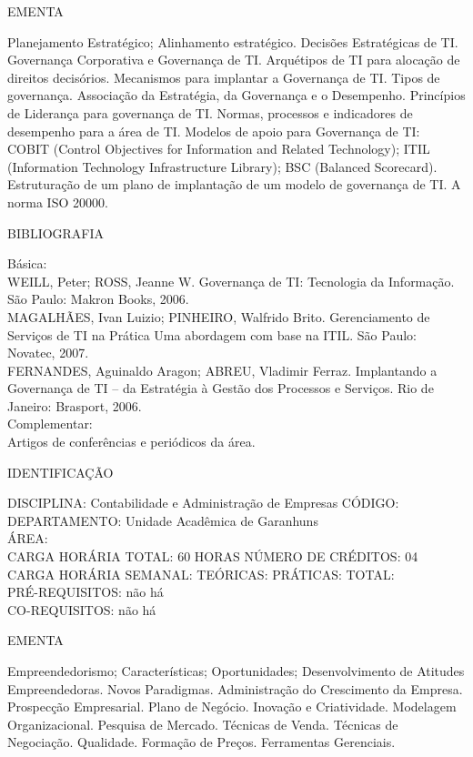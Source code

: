\documentclass[
	12pt,				%
	openright,			%
  oneside,     %
	a4paper,			%
	english,			%
	french,				%
	spanish,			%
	brazil				%
	]{abntex2}
\begin{document}
\begin{apendicesenv}
EMENTA 

Planejamento Estratégico; Alinhamento estratégico. Decisões Estratégicas
de TI. Governança Corporativa e Governança de TI. Arquétipos de TI para
alocação de direitos decisórios. Mecanismos para implantar a Governança
de TI. Tipos de governança. Associação da Estratégia, da Governança e o
Desempenho. Princípios de Liderança para governança de TI. Normas,
processos e indicadores de desempenho para a área de TI. Modelos de
apoio para Governança de TI: COBIT (Control Objectives for Information
and Related Technology); ITIL (Information Technology Infrastructure
Library); BSC (Balanced Scorecard). Estruturação de um plano de
implantação de um modelo de governança de TI. A norma ISO 20000.

BIBLIOGRAFIA 

Básica:\\
WEILL, Peter; ROSS, Jeanne W. Governança de TI: Tecnologia da
Informação. São Paulo: Makron Books, 2006.\\
MAGALHÃES, Ivan Luizio; PINHEIRO, Walfrido Brito. Gerenciamento de
Serviços de TI na Prática  Uma abordagem com base na ITIL. São
Paulo: Novatec, 2007.\\
FERNANDES, Aguinaldo Aragon; ABREU, Vladimir Ferraz. Implantando a
Governança de TI -- da Estratégia à Gestão dos Processos e Serviços.
Rio de Janeiro: Brasport, 2006.\\
Complementar:\\
Artigos de conferências e periódicos da área.

\newpage IDENTIFICAÇÃO

DISCIPLINA: Contabilidade e Administração de Empresas CÓDIGO:\\ 
DEPARTAMENTO: Unidade Acadêmica de Garanhuns\\
ÁREA: \\
CARGA HORÁRIA TOTAL: 60 HORAS NÚMERO DE CRÉDITOS: 04\\
CARGA HORÁRIA SEMANAL: TEÓRICAS: PRÁTICAS: TOTAL: \\
PRÉ-REQUISITOS: não há\\
CO-REQUISITOS: não há

EMENTA 

Empreendedorismo; Características; Oportunidades; Desenvolvimento de
Atitudes Empreendedoras. Novos Paradigmas. Administração do Crescimento
da Empresa. Prospecção Empresarial. Plano de Negócio. Inovação e
Criatividade. Modelagem Organizacional. Pesquisa de Mercado. Técnicas
de Venda. Técnicas de Negociação. Qualidade. Formação de Preços.
Ferramentas Gerenciais.


\end{apendicesenv}
\end{document}
